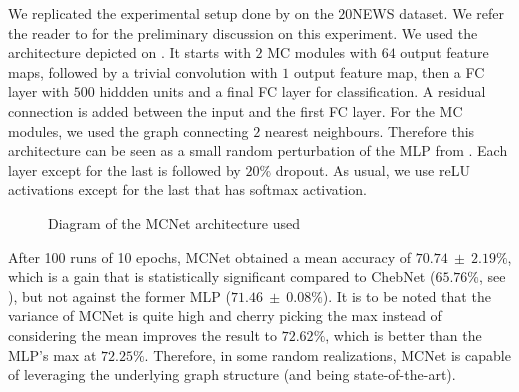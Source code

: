 We replicated the experimental setup done by \cite{defferrard2016convolutional} on the $20$NEWS dataset. We refer the reader to  for the preliminary discussion on this experiment. We used the architecture depicted on . It starts with $2$ MC modules with $64$ output feature maps, followed by a trivial convolution with $1$ output feature map, then a FC layer with $500$ hiddden units and a final FC layer for classification. A residual connection is added between the input and the first FC layer. For the MC modules, we used the graph connecting $2$ nearest neighbours. Therefore this architecture can be seen as a small random perturbation of the MLP from . Each layer except for the last is followed by $20\%$ dropout. As usual, we use reLU activations except for the last that has softmax activation.

\begin{figure}[h!tbp]
\centering
{}
\caption{Diagram of the MCNet architecture used}
\label{fig:archiMC}
\end{figure}

After 100 runs of 10 epochs, MCNet obtained a mean accuracy of $70.74~\pm~2.19\%$, which is a gain that is statistically significant compared to ChebNet ($65.76\%$, see ), but not against the former MLP ($71.46~\pm~0.08\%$). It is to be noted that the variance of MCNet is quite high and cherry picking the max instead of considering the mean improves the result to $72.62\%$, which is better than the MLP's max at $72.25\%$. Therefore, in some random realizations, MCNet is capable of leveraging the underlying graph structure (and being state-of-the-art).

